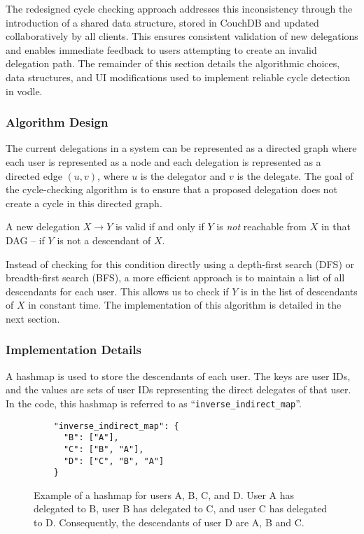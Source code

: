 The redesigned cycle checking approach addresses this inconsistency through the introduction of a shared data structure, stored in CouchDB and updated collaboratively by all clients. This ensures consistent validation of new delegations and enables immediate feedback to users attempting to create an invalid delegation path. The remainder of this section details the algorithmic choices, data structures, and UI modifications used to implement reliable cycle detection in vodle.

\subsubsection{Algorithm Design}
The current delegations in a system can be represented as a directed graph where each user is represented as a node and each delegation is represented as a directed edge $(u,v)$, where $u$ is the delegator and $v$ is the delegate. The goal of the cycle-checking algorithm is to ensure that a proposed delegation does not create a cycle in this directed graph.

A new delegation $X\to Y$ is valid if and only if $Y$ is \emph{not} reachable from $X$ in that DAG -- if $Y$ is not a descendant of $X$.

Instead of checking for this condition directly using a depth-first search (DFS) or breadth-first search (BFS), a more efficient approach is to maintain a list of all descendants for each user. This allows us to check if $Y$ is in the list of descendants of $X$ in constant time. The implementation of this algorithm is detailed in the next section.

\subsubsection{Implementation Details}
A hashmap is used to store the descendants of each user. The keys are user IDs, and the values are sets of user IDs representing the direct delegates of that user. In the code, this hashmap is referred to as ``\verb|inverse_indirect_map|''.
\begin{figure}[H]
  \centering
  \begin{verbatim}
    "inverse_indirect_map": {
      "B": ["A"],
      "C": ["B", "A"],
      "D": ["C", "B", "A"]
    }
  \end{verbatim}
  \caption{Example of a hashmap for users A, B, C, and D. User A has delegated to B, user B has delegated to C, and user C has delegated to D. Consequently, the descendants of user D are A, B and C.}
  \label{fig:inverse_indirect_map}
\end{figure}

